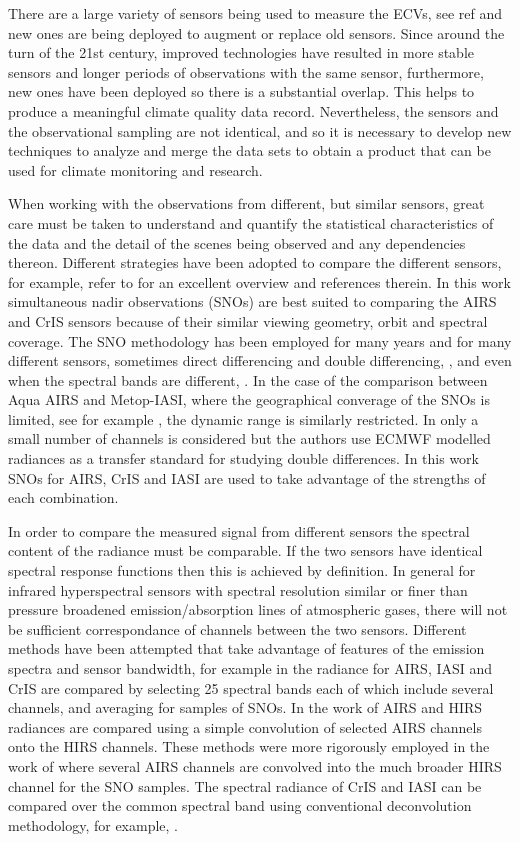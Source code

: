 \documentclass[twocolumn,10pt]{article}
\begin{document}
There are a large variety of sensors being used to measure the ECVs, see ref \cite{Hollmann2013} and new ones are being deployed to augment or replace old sensors.  Since around the turn of the 21st century, improved technologies have resulted in more stable sensors and longer periods of observations with the same sensor, furthermore, new ones have been deployed so there is a substantial overlap. This helps to produce a meaningful climate quality data record. Nevertheless, the sensors and the observational sampling are not identical, and so it is necessary to develop new techniques to analyze and merge the data sets to obtain a product that can be used for climate monitoring and research.

When working with the observations from different, but similar sensors, great care must be taken to understand and quantify the statistical characteristics of the data and the detail of the scenes being observed and any dependencies thereon. Different strategies have been adopted to compare the different sensors, for example, refer to \cite{Chander2013} for an excellent overview and references therein. In this work simultaneous nadir observations (SNOs) are best suited to comparing the AIRS and CrIS sensors because of their similar viewing geometry, orbit and spectral coverage. The SNO methodology has been employed for many years and for many different sensors, sometimes direct differencing \cite{Wang2007} and double differencing, \cite{Wang2011}, and even when the spectral bands are different, \cite{Uprety2013}. In the case of the comparison between Aqua AIRS and Metop-IASI, where the geographical converage of the SNOs is limited, see for example \cite{GSICS2008}, the dynamic range is similarly restricted. In \cite{Elliott2009} only a small number of channels is considered but the authors use ECMWF modelled radiances as a transfer standard for studying double differences. In this work SNOs for AIRS, CrIS and IASI are used to take advantage of the strengths of each combination.

In order to compare the measured signal from different sensors the spectral content of the radiance must be comparable. If the two sensors have identical spectral response functions then this is achieved by definition. In general for infrared hyperspectral sensors with spectral resolution similar or finer than pressure broadened emission/absorption lines of atmospheric gases, there will not be sufficient correspondance of channels between the two sensors. Different methods have been attempted that take advantage of features of the emission spectra and sensor bandwidth, for example in \cite{Wang2015} the radiance for AIRS, IASI and CrIS are compared by selecting 25 spectral bands each of which include several channels, and averaging for samples of SNOs. In the work of \cite{Ciren2003} AIRS and HIRS radiances are compared using a simple convolution of selected AIRS channels onto the HIRS channels. These methods were more rigorously employed in the work of \cite{Wang2007} where several AIRS channels are convolved into the much broader HIRS channel for the SNO samples. The spectral radiance of CrIS and IASI can be compared over the common spectral band using conventional deconvolution methodology, for example, \cite{Wang2015}.
\end{document}
